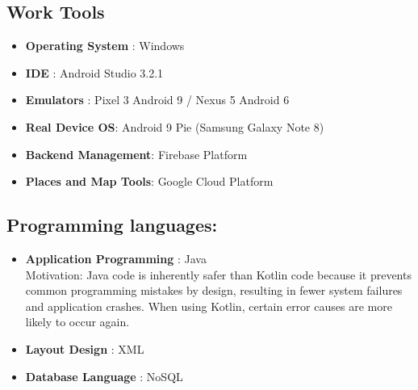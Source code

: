 \subsection{Work Tools}
\begin{itemize}
\item \textbf{Operating System }: Windows 
\item \textbf{IDE }: Android Studio 3.2.1
\item \textbf{Emulators }: Pixel 3 Android 9 / Nexus 5 Android 6
\item \textbf{Real Device OS}: Android 9 Pie (Samsung Galaxy Note 8)
\item \textbf{Backend Management}: Firebase Platform
\item \textbf{Places and Map Tools}: Google Cloud Platform
\end{itemize}
 

\subsection{Programming languages:} 
\begin{itemize}
\item \textbf{Application Programming }: Java\\
Motivation: Java code is inherently safer than Kotlin code because it 
prevents common programming mistakes by design, resulting in fewer 
system failures and application crashes. When using Kotlin, certain error 
causes are more likely to occur again.
\item \textbf{Layout Design }: XML
\item \textbf{Database Language }: NoSQL
\end{itemize}

